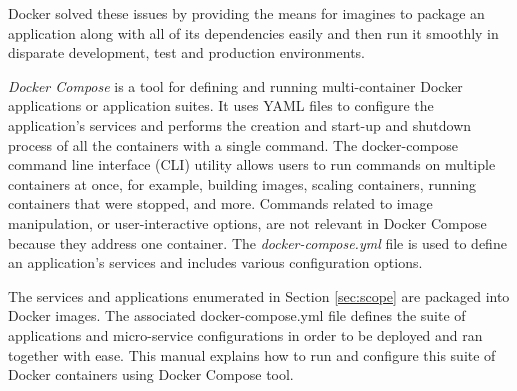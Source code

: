 	Docker solved these issues by providing the means for imagines to package an application along with all of its dependencies easily and then run it smoothly in disparate development, test and production
environments.
		
	\textit{Docker Compose} is a tool for defining and running multi-container Docker applications or application suites. It uses YAML files to configure the application's services and performs the creation and start-up and shutdown process of all the containers with a single command. The docker-compose command line interface (CLI) utility allows users to run commands on multiple containers at once, for example, building images, scaling containers, running containers that were stopped, and more. Commands related to image manipulation, or user-interactive options, are not relevant in Docker Compose because they address one container. The \textit{docker-compose.yml} file is used to define an application's services and includes various configuration options.

	The services and applications enumerated in Section \ref{sec:scope} are packaged into Docker images. The associated docker-compose.yml file defines the suite of applications and micro-service configurations in order to be deployed and ran together with ease. This manual explains how to run and configure this suite of Docker containers using Docker Compose tool.
